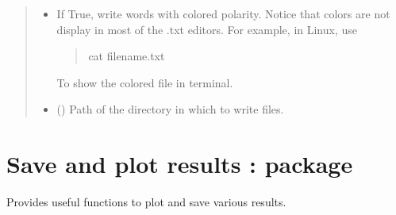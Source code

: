 \documentclass[letterpaper,10pt,english]{sphinxmanual}
\begin{document}
\begin{fulllineitems}
\begin{quote}
\begin{description}
\begin{itemize}
\item {} 
 \textendash{} 
If True, write words with colored polarity. Notice that colors are not display in most of the .txt editors.
For example, in Linux, use
\begin{quote}

%
\begin{sphinxVerbatim}[commandchars=\\\{\}]
cat file\PYGZus{}name.txt
\end{sphinxVerbatim}
\end{quote}

To show the colored file in terminal.


\item {} 
 () \textendash{} Path of the directory in which to write files.

\end{itemize}

\end{description}\end{quote}

\end{fulllineitems}



\chapter{Save and plot results :  package}
\label{\detokenize{utils:save-and-plot-results-utils-package}}\label{\detokenize{utils::doc}}
Provides useful functions to plot and save various results.

\label{\detokenize{utils:module-loacore.utils.file_writer}}\label{\detokenize{utils:module-loacore.utils.plot_polarities}}
\end{document}
